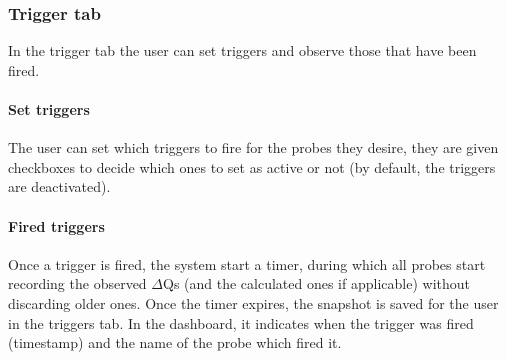     \subsubsection{Trigger tab}
        In the trigger tab the user can set triggers and observe those that have been fired.

    \paragraph{Set triggers}
        The user can set which triggers to fire for the probes they desire, they are given checkboxes to decide which ones to set as active or not (by default, the triggers are deactivated).
    
    \paragraph{Fired triggers}
        Once a trigger is fired, the system start a timer, during which all probes start recording the observed $\Delta$Qs (and the calculated ones if applicable) without discarding older ones. Once the timer expires, the snapshot is saved for the user in the triggers tab. In the dashboard, it indicates when the trigger was fired (timestamp) and the name of the probe which fired it.
